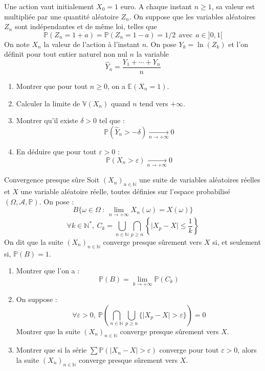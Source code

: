 \documentclass[french,a4paper]{article}
\renewcommand{\P}{\mathbb{P}}
\newcommand{\N}{\mathbb{N}}
\newcommand{\st}{^*}
\newcommand{\E}{\mathbb{E}}
\newcommand{\V}{\mathbb{V}}
\theoremstyle{plain}
\theoremstyle{definition}
\theoremstyle{remark}
\begin{document}
\begin{ex}{}
	Une action vaut initialement $X_0=1$ euro. A chaque instant $n\geqslant 1$, sa valeur est multipliée par une quantité aléatoire $Z_n$. On suppose que les variables aléatoires $Z_n$ sont indépendantes et de même loi, telles que $$\P(Z_n=1+a)=\P(Z_n=1-a)=1/2\ \ \text{avec}\ \ a\in]0,1[$$ On note $X_n$ la valeur de l'action à l'instant $n$. On pose $Y_k=\ln(Z_k)$ et l'on définit pour tout entier naturel non nul $n$ la variable $$\hat{Y}_n=\frac{Y_1+\cdots+Y_n}{n}$$
	\begin{enumerate}
		\item Montrer que pour tout $n\geqslant0$, on a $\E(X_n=1)$.
		\item Calculer la limite de $\V(X_n)$ quand $n$ tend vers $+\infty$.
		\item Montrer qu'il existe $\delta>0$ tel que : $$\P\left(\hat{Y}_n>-\delta\right)\xrightarrow[n\to+\infty]{}0$$
		\item En déduire que pour tout $\varepsilon>0$ : $$\P(X_n>\varepsilon)\xrightarrow[n\to+\infty]{}0$$
	\end{enumerate}
\end{ex}

\begin{ex}{Convergence presque sûre}
	Soit $(X_n)_{n\in\N}$ une suite de variables aléatoires réelles et $X$ une variable aléatoire réelle, toutes définies sur l'espace probabilisé $(\Omega,\mathcal{A},\P)$. On pose : $$B\{\omega\in\Omega\ : \ \underset{n\to+\infty}{\lim}X_n(\omega)=X(\omega)\}$$ $$\forall k\in\N\st,\ C_k=\bigcup_{n\in\N}\bigcap_{p\geqslant n}\left\{\lvert X_p-X\rvert\leqslant\frac{1}{k}\right\}$$ On dit que la suite $(X_n)_{n\in\N}$ converge presque sûrement vers $X$ si, et seulement si, $\P(B)=1$.
	\begin{enumerate}
		\item Montrer que l'on a : $$\P(B)=\underset{k\to+\infty}{\lim}\P(C_k)$$
		\item On suppose : $$\forall \varepsilon>0,\ \P\left(\bigcap_{n\in\N}\bigcup_{p\geqslant n}\{\lvert X_p-X\rvert>\varepsilon\}\right)=0$$ Montrer que la suite $(X_n)_{n\in\N}$ converge presque sûrement vers $X$.
		\item Montrer que si la série $\displaystyle\sum\P(\lvert X_n-X\rvert>\varepsilon)$ converge pour tout $\varepsilon>0$, alors la suite $(X_n)_{n\in\N}$ converge presque sûrement vers $X$.
	\end{enumerate}
\end{ex}
\end{document}
